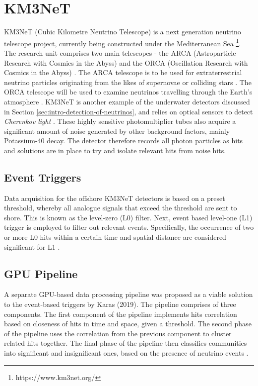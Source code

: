 \section{KM3NeT}
\label{sec:intro-km3net}
KM3NeT (Cubic Kilometre Neutrino Telescope) is a next generation neutrino telescope project, currently being constructed under the Mediterranean Sea \footnote{https://www.km3net.org/}. The research unit comprises two main telescopes - the ARCA (Astroparticle Research with Cosmics in the Abyss) and the ORCA (Oscillation Research with Cosmics in the Abyss) \cite{km3net_2017}. The ARCA telescope is to be used for extraterrestrial neutrino particles originating from the likes of supernovae or colliding stars \cite{km3net_2017}. The ORCA telescope will be used to examine neutrinos travelling through the Earth's atmosphere \cite{km3net_2017}. KM3NeT is another example of the underwater detectors discussed in Section \ref{sec:intro-detection-of-neutrinos}, and relies on optical sensors to detect \textit{Cherenkov light} \cite{km3net_2017}. These highly sensitive photomultiplier tubes also acquire a significant amount of noise generated by other background factors, mainly Potassium-40 decay. The detector therefore records all photon particles as hits and solutions are in place to try and isolate relevant hits from noise hits. 

\subsection{Event Triggers}
\label{sec:intro-trigger}
Data acquisition for the offshore KM3NeT detectors is based on a preset threshold, whereby all analogue signals that exceed the threshold are sent to shore. This is known as the level-zero (L0) filter. Next, event based level-one (L1) trigger is employed to filter out relevant events. Specifically, the occurrence of two or more L0 hits within a certain time and spatial distance are considered significant for L1 \cite{km3net_2017}. 

\subsection{GPU Pipeline}
A separate GPU-based data processing pipeline was proposed as a viable solution to the event-based triggers by Karas (2019). The pipeline comprises of three components. The first component of the pipeline implements hits correlation based on closeness of hits in time and space, given a threshold. The second phase of the pipeline uses the correlation from the previous component to cluster related hits together. The final phase of the pipeline then classifies communities into significant and insignificant ones, based on the presence of neutrino events \cite{karas_2019}.
 

